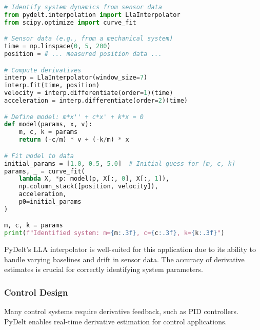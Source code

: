 \documentclass[11pt,a4paper]{article}
\begin{document}
\begin{lstlisting}[language=Python, caption=System identification example]
# Identify system dynamics from sensor data
from pydelt.interpolation import LlaInterpolator
from scipy.optimize import curve_fit

# Sensor data (e.g., from a mechanical system)
time = np.linspace(0, 5, 200)
position = # ... measured position data ...

# Compute derivatives
interp = LlaInterpolator(window_size=7)
interp.fit(time, position)
velocity = interp.differentiate(order=1)(time)
acceleration = interp.differentiate(order=2)(time)

# Define model: m*x'' + c*x' + k*x = 0
def model(params, x, v):
    m, c, k = params
    return (-c/m) * v + (-k/m) * x

# Fit model to data
initial_params = [1.0, 0.5, 5.0]  # Initial guess for [m, c, k]
params, _ = curve_fit(
    lambda X, *p: model(p, X[:, 0], X[:, 1]),
    np.column_stack([position, velocity]),
    acceleration,
    p0=initial_params
)

m, c, k = params
print(f"Identified system: m={m:.3f}, c={c:.3f}, k={k:.3f}")
\end{lstlisting}

PyDelt's LLA interpolator is well-suited for this application due to its ability to handle varying baselines and drift in sensor data. The accuracy of derivative estimates is crucial for correctly identifying system parameters.

\subsubsection{Control Design}

Many control systems require derivative feedback, such as PID controllers. PyDelt enables real-time derivative estimation for control applications.
\end{document}

